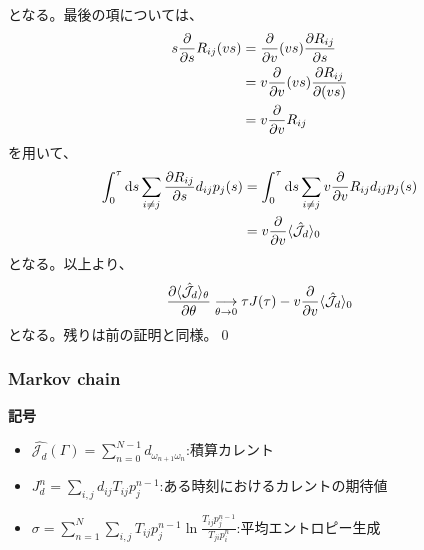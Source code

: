 \documentclass[a4paper,11pt]{jsarticle}
\numberwithin{equation}{section}
\begin{document}
となる。最後の項については、
\begin{align}
    s\pdv{s}R_{ij}(vs) &= \pdv{v}(vs)\pdv{R_{ij}}{s}\\
    &= v\pdv{v}(vs)\pdv{R_{ij}}{(vs)}\\
    &= v\pdv{v}R_{ij}
\end{align}
を用いて、
\begin{align}
    \int_{0}^{\tau} \dd{s} \sum_{i \neq j} \pdv{R_{ij}}{s}d_{ij}p_j(s) 
    &= \int_{0}^{\tau} \dd{s} \sum_{i \neq j} v\pdv{v}R_{ij}d_{ij}p_j(s)\\
    &= v\pdv{v}\langle \hat{\mathcal{J}_d} \rangle_0
\end{align}
となる。以上より、
\begin{align}
    \pdv{\langle \hat{\mathcal{J}_d} \rangle_\theta}{\theta} \underset{\theta \to 0}{\longrightarrow}  \tau J(\tau)- v\pdv{v}\langle \hat{\mathcal{J}_d} \rangle_0
\end{align}
となる。残りは前の証明と同様。\qed\\


\subsubsection{Markov chain}



\textbf{記号}
\begin{itemize}
    \item ${\hat{\mathcal{J}_d}}(\Gamma) = \sum_{n=0}^{N-1} d_{\omega_{n+1}\omega_n}$:積算カレント
    \item $J_d^n = \sum_{i,j} d_{ij} T_{ij} p_{j}^{n-1}$:ある時刻におけるカレントの期待値
    \item $\sigma = \sum_{n=1}^{N} \sum_{i,j} T_{ij} p_{j}^{n-1} \ln \frac{T_{ij} p_{j}^{n-1}}{T_{ji} p_{i}^{n}}$:平均エントロピー生成
\end{itemize}
\end{document}
